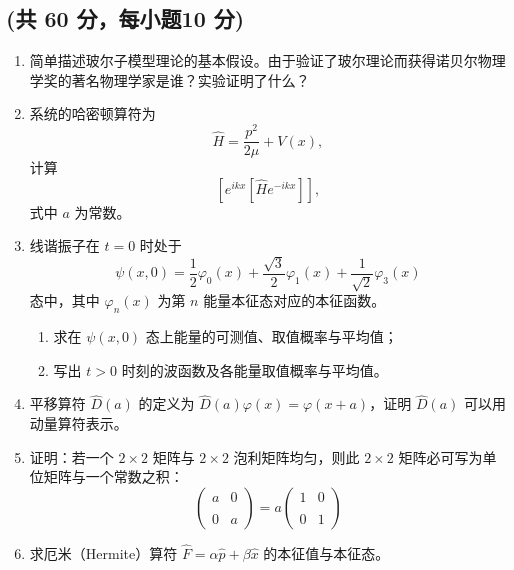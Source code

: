 
\subsection{(共 60 分，每小题10 分)}
\begin{enumerate}
\item 简单描述玻尔子模型理论的基本假设。由于验证了玻尔理论而获得诺贝尔物理学奖的著名物理学家是谁？实验证明了什么？

\item 系统的哈密顿算符为 
$$\hat{H} = \frac{p^2}{2\mu} + V(x),~$$
计算
$$\left[e^{ikx}[\hat{H}e^{-ikx}]\right],~$$
式中 $a$ 为常数。

\item 线谐振子在 $t = 0$ 时处于
$$ \psi(x, 0) = \frac{1}{2}\varphi_0(x) + \frac{\sqrt{3}}{2}\varphi_1(x) + \frac{1}{\sqrt{2}}\varphi_3(x)~ $$
态中，其中 $\varphi_n(x)$ 为第 $n$ 能量本征态对应的本征函数。
\begin{enumerate}
\item 求在 $\psi(x, 0)$ 态上能量的可测值、取值概率与平均值；
\item 写出 $t > 0$ 时刻的波函数及各能量取值概率与平均值。
\end{enumerate}

\item 平移算符 $\hat{D}(a)$ 的定义为 $\hat{D}(a)\varphi(x) = \varphi(x + a)$，证明 $\hat{D}(a)$ 可以用动量算符表示。

\item 证明：若一个 $2 \times 2$ 矩阵与 $2 \times 2$ 泡利矩阵均匀，则此 $2 \times 2$ 矩阵必可写为单位矩阵与一个常数之积：
$$\left( \begin{matrix} a & 0 \\\\ 0 & a \end{matrix} \right) = a \left( \begin{matrix} 1 & 0 \\\\ 0 & 1 \end{matrix} \right)~$$

\item 求厄米（Hermite）算符 $\hat{F} = \alpha\hat{p} + \beta\hat{x}$ 的本征值与本征态。
\end{enumerate}
